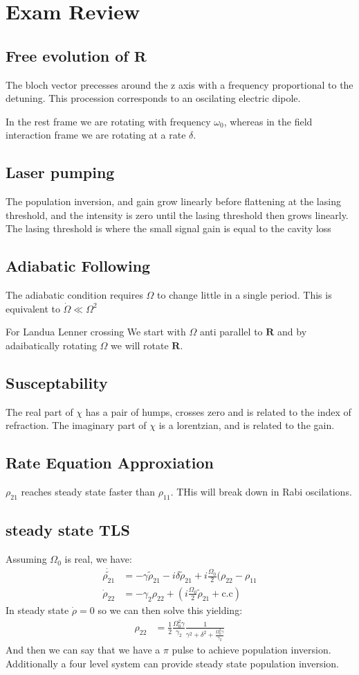 \section*{Exam Review}
\subsection*{Free evolution of $\bm{R}$}
The bloch vector precesses around the z axis with a frequency proportional to the detuning.
This procession corresponds to an oscilating electric dipole.

In the rest frame we are rotating with frequency $\omega_0$, whereas in the field interaction frame we are rotating at a rate $\delta$.
\subsection*{Laser pumping}
The population inversion, and gain grow linearly before flattening at the lasing threshold, and the intensity is zero until the lasing threshold then grows linearly. The lasing threshold is where the small signal gain is equal to the cavity loss
\subsection*{Adiabatic Following}
The adiabatic condition requires $\Omega$ to change little in a single period. This is equivalent to $\dot{\Omega} \ll \Omega^2$

For Landua Lenner crossing We start with $\Omega$ anti parallel to $\bm{R}$ and by adaibatically rotating $\Omega$ we will rotate $\bm{R}$.
\subsection*{Susceptability}
The real part of $\chi$ has a pair of humps, crosses zero and is related to the index of refraction.
The imaginary part of $\chi$ is a lorentzian, and is related to the gain.
\subsection*{Rate Equation Approxiation}
$\rho_{21}$ reaches steady state faster than $\rho_{11}$. THis will break down in Rabi oscilations.
\subsection*{steady state TLS}
Assuming $\Omega_0$ is real, we have:
\begin{align*}
	\dot{\tilde{\rho_{21}}} &= -\gamma\tilde{\rho}_{21} - i\delta\tilde{\rho}_{21} + i\frac{\Omega_0}{2}(\rho_{22} - \rho_{11} \\
	\dot{\rho}_{22} &= -\gamma_2\rho_{22} + \left(i\frac{\Omega_0}{2}\tilde{\rho}_{21} + \text{c.c}\right)
\end{align*}
In steady state $\dot{\rho} = 0$ so we can then solve this yielding:
\begin{align*}
	\rho_{22} &= \frac{1}{2} \frac{\Omega_0^2\gamma}{\gamma_2} \frac{1}{\gamma^2 + \delta^2 + \frac{\Omega_0^2\gamma}{\gamma_2}}
\end{align*}
And then we can say that we have a $\pi$ pulse to achieve population inversion. Additionally a four level system can provide steady state population inversion.
